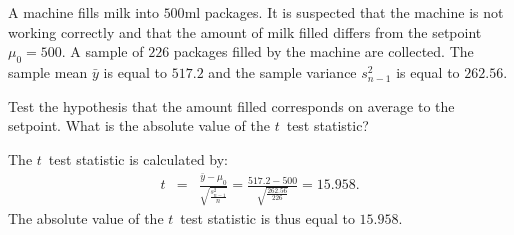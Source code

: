 \begin{question}
  A machine fills milk into $500$ml packages. It is suspected that the 
  machine is not working correctly and that the amount of milk filled differs 
  from the setpoint $\mu_0 = 500$. A sample of $226$ packages filled by the 
  machine are collected. The sample mean $\bar{y}$ is equal to $517.2$ and 
  the sample variance $s^2_{n-1}$ is equal to $262.56$.

  Test the hypothesis that the amount filled corresponds on average to the 
  setpoint. What is the absolute value of the $t$~test statistic?
\end{question}
\begin{solution}
  The $t$~test statistic is calculated by:
  \begin{eqnarray*}
    t & = & \frac{\bar y - \mu_0}{\sqrt{\frac{s^2_{n-1}}{n}}}
    = \frac{517.2 - 500}{\sqrt{\frac{262.56}{226}}} = 15.958.
  \end{eqnarray*}
  The absolute value of the $t$~test statistic is thus equal to $15.958$.
\end{solution}

